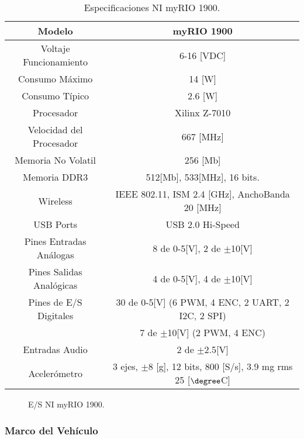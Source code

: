 \documentclass[\main/main.tex]{subfiles}
\begin{document}
\begin{table}[H]
\noindent \begin{centering}
\begin{tabular}{|c|c|}
\hline 
Modelo & myRIO 1900\tabularnewline
\hline 
\hline 
Voltaje Funcionamiento & 6-16 {[}VDC{]}\tabularnewline
\hline 
Consumo Máximo & 14 {[}W{]}\tabularnewline
\hline 
Consumo Típico & 2.6 {[}W{]}\tabularnewline
\hline 
Procesador & Xilinx Z-7010\tabularnewline
\hline 
Velocidad del Procesador & 667 {[}MHz{]}\tabularnewline
\hline 
Memoria No Volatil & 256 {[}Mb{]}\tabularnewline
\hline 
Memoria DDR3 & 512{[}Mb{]}, 533{[}MHz{]}, 16 bits.\tabularnewline
\hline 
Wireless & IEEE 802.11, ISM 2.4 {[}GHz{]}, AnchoBanda 20 {[}MHz{]}\tabularnewline
\hline 
USB Ports & USB 2.0 Hi-Speed\tabularnewline
\hline 
Pines Entradas Análogas  & 8 de 0-5{[}V{]}, 2 de $\pm$10{[}V{]}\tabularnewline
\hline 
Pines Salidas Analógicas  & 4 de 0-5{[}V{]}, 4 de $\pm$10{[}V{]}\tabularnewline
\hline 
Pines de E/S Digitales & 30 de 0-5{[}V{]} (6 PWM, 4 ENC, 2 UART, 2 I2C, 2 SPI)\tabularnewline
 & 7 de $\pm$10{[}V{]} (2 PWM, 4 ENC)\tabularnewline
\hline 
Entradas Audio & 2 de $\pm$2.5{[}V{]}\tabularnewline
\hline 
Acelerómetro & 3 ejes, $\pm$8 {[}g{]}, 12 bits, 800 {[}S/s{]}, 3.9 mg rms 25 [$\degree$C]\tabularnewline
\hline 
\end{tabular}
\par\end{centering}
\caption{Especificaciones NI myRIO 1900.}
\end{table}

\textcompwordmark{}

\begin{figure}[H]
\noindent \begin{centering}
\par\end{centering}
\caption{E/S NI myRIO 1900.}
\end{figure}


\subsubsection{Marco del Vehículo}
\end{document}
